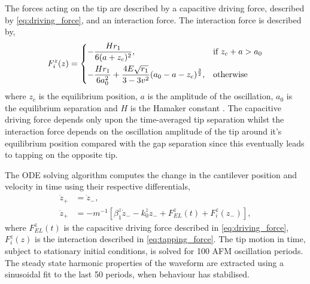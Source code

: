 \documentclass{article}
\begin{document}
The forces acting on the tip are described by a capacitive driving force, described by \eqref{eq:driving_force}, and an interaction force. The interaction force is described by,
\begin{equation}
	F_i^z(z) =
	\begin{dcases}
	-\frac{H r_1}{6(a+z_c)^2}, & \text{if } z_c + a > a_0 \\
	-\frac{H r_1}{6a_0^2} + \frac{4E\sqrt{r_1}}{3 - 3v^2} (a_0-a-z_c)^{\frac{3}{2}}, & \text{otherwise}
	\end{dcases}
	\label{eq:tapping_force}
\end{equation}
where $z_c$ is the equilibrium position, $a$ is the amplitude of the oscillation, $a_0$ is the equilibrium separation and $H$ is the Hamaker constant \cite{tamayo1996deformation, garcia1999attractive, san2002unifying, lee2002nonlinear}. The capacitive driving force depends only upon the time-averaged tip separation whilst the interaction force depends on the oscillation amplitude of the tip around it's equilibrium position compared with the gap separation since this eventually leads to tapping on the opposite tip.

The ODE solving algorithm computes the change in the cantilever position and velocity in time using their respective differentials,
\begin{align}
	\dot{z}_+ &= \dot{z}_-, \\
	\ddot{z}_+ &= -m^{-1}\left[\beta_1^z\dot{z}_- - k_0^zz_- + F_{EL}^z(t) + F_i^z(z_-)\right],
\end{align}
where $F_{EL}^z(t)$ is the capacitive driving force described in \eqref{eq:driving_force}, $F_i^z(z)$ is the interaction described in \eqref{eq:tapping_force}. The tip motion in time, subject to stationary initial conditions, is solved for 100 AFM oscillation periods. The steady state harmonic properties of the waveform are extracted using a sinusoidal fit to the last 50 periods, when behaviour has stabilised.
\end{document}
